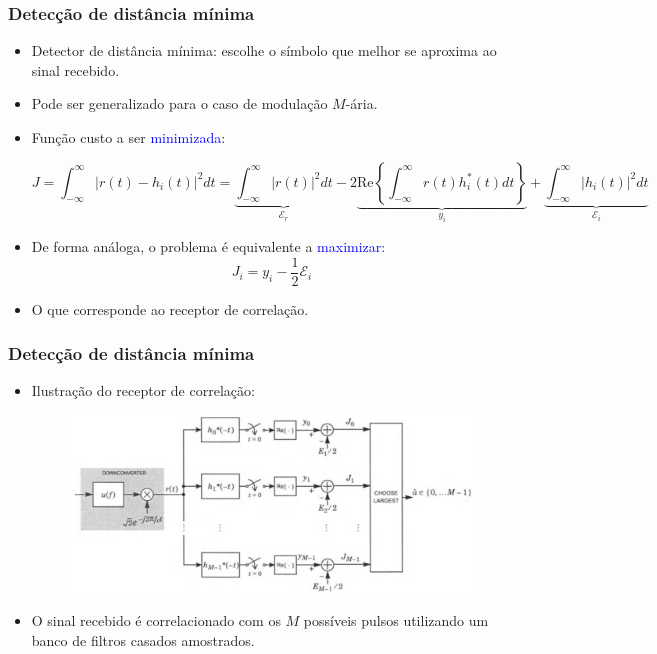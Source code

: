 \begin{frame}
	\frametitle{Detecção de distância mínima}

	\begin{itemize}
	    \item Detector de distância mínima: escolhe o símbolo que melhor se aproxima ao sinal recebido.
	    \item Pode ser generalizado para o caso de modulação $M$-ária.
	    \item Função custo a ser \textcolor{blue}{minimizada}:
	    \begin{footnotesize}
	    \begin{equation*}
		J = \int_{-\infty}^{\infty} |r(t) - h_i(t)|^2 dt = \underbrace{\int_{-\infty}^{\infty} |r(t)|^2 dt}_{\mathcal{E}_r} - 2 \underbrace{\mathrm{Re}\left\{\int_{-\infty}^{\infty} r(t)h_i^*(t) dt \right\}}_{y_i} + \underbrace{\int_{-\infty}^{\infty} |h_i(t)|^2 dt}_{\mathcal{E}_i}
	    \end{equation*}
	    \end{footnotesize}
	    \item De forma análoga, o problema é equivalente a \textcolor{blue}{maximizar}:
	    \begin{equation*}
		 J_i = y_i - \frac{1}{2}\mathcal{E}_i
	    \end{equation*}
	    \item O que corresponde ao receptor de correlação.
	\end{itemize}
\end{frame}

\begin{frame}
	\frametitle{Detecção de distância mínima}

	\begin{itemize}
	    \item Ilustração do receptor de correlação:
	    \begin{figure}[t]	
	      \begin{center}
		\includegraphics[width=0.85\columnwidth]{figs/adv_02}
	      \end{center}
	    \end{figure}
	    \item O sinal recebido é correlacionado com os $M$ possíveis pulsos utilizando um banco de filtros casados amostrados.
	\end{itemize}
\end{frame}

